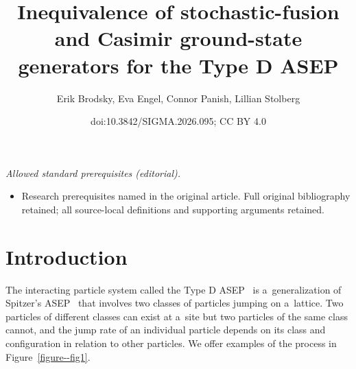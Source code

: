 \documentclass[10pt,a4paper]{amsart}
\title{Inequivalence of stochastic-fusion and Casimir ground-state generators for the Type D ASEP}
\author{Erik Brodsky, Eva Engel, Connor Panish, Lillian Stolberg}
\date{doi:10.3842/SIGMA.2026.095; CC BY 4.0}
\numberwithin{equation}{section}
\theoremstyle{definition}
\begin{document}
\maketitle
\noindent\textit{Allowed standard prerequisites (editorial).}\begin{itemize}
\item Research prerequisites named in the original article. Full original bibliography retained; all source-local definitions and supporting arguments retained.
\end{itemize}\medskip
\section{Introduction} \label{section--Intro}

The interacting particle system called the Type D ASEP~\cite{kuan2020interactingparticlesystemstype} is a~generalization of Spitzer's ASEP~\cite{SPITZER1970246} that involves two classes of particles jumping on a~lattice. Two particles of different classes can exist at a~site but two particles of the same class cannot, and the jump rate of an individual particle depends on its class and configuration in relation to other particles. We offer examples of the process in Figure~\ref{figure--fig1}.
\end{document}
